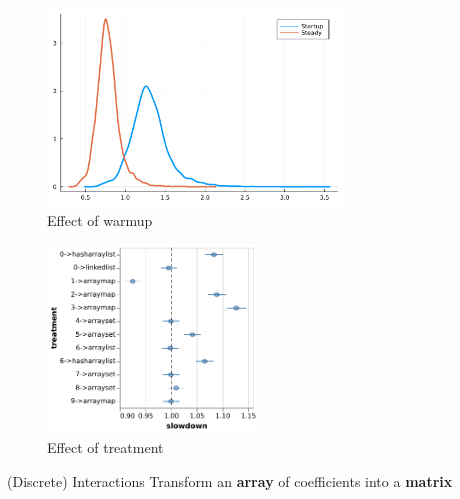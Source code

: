 \documentclass[aspectratio=169,xcolor=svgnames]{beamer}
\begin{document}
\begin{frame}
  \begin{figure}[ht]
    \centering
    \includegraphics[width=0.7\textwidth]{figures/plot_warmup_distribution_bloat.pdf}
    \caption{Effect of warmup}
  \end{figure}
\end{frame}

\begin{frame}
  \begin{figure}[ht]
    \centering
    \includegraphics[width=0.5\textwidth]{figures/plot_effects_no_interaction_bloat.pdf}
    \caption{Effect of treatment}
  \end{figure}
\end{frame}

\begin{frame}
  \begin{block}{(Discrete) Interactions}
    Transform an \textbf{array} of coefficients into a \textbf{matrix}
  \end{block}
\end{frame}
\end{document}
